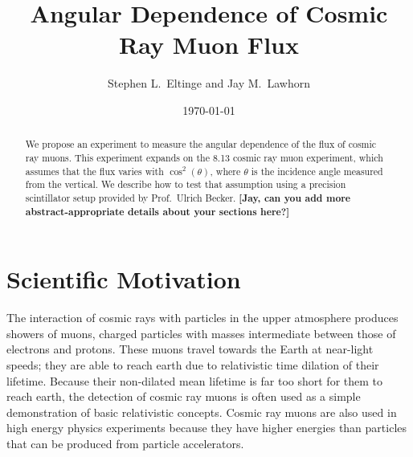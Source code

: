 \usepackage{lgrind} %
\usepackage{chapterbib} %
\usepackage{color} %
\usepackage{graphics}      %
\usepackage[pdftex]{graphicx} %
\usepackage{longtable}     %
\usepackage{epsf} %
\usepackage{bm}            %
\usepackage{thumbpdf}
\usepackage[colorlinks=true]{hyperref} %
\usepackage{multirow}
\usepackage{subfigure}

\newcommand{\cd}{$\cdot$}

%
%


\title{Angular Dependence of Cosmic Ray Muon Flux}
\author{Stephen L.\ Eltinge and Jay M.\ Lawhorn}
\date{\today}

\begin{abstract}
We propose an experiment to measure the angular dependence of the flux of cosmic ray muons. This experiment expands on the 8.13 cosmic ray muon experiment, which assumes that the flux varies with $\cos^2(\theta)$, where $\theta$ is the incidence angle measured from the vertical. We describe how to test that assumption using a precision scintillator setup provided by Prof.\ Ulrich Becker. \textbf{[Jay, can you add more abstract-appropriate details about your sections here?]}
\end{abstract}

\maketitle

\section{Scientific Motivation}

The interaction of cosmic rays with particles in the upper atmosphere produces showers of muons, charged particles with masses intermediate between those of electrons and protons. These muons travel towards the Earth at near-light speeds; they are able to reach earth due to relativistic time dilation of their lifetime. Because their non-dilated mean lifetime is far too short for them to reach earth, the detection of cosmic ray muons is often used as a simple demonstration of basic relativistic concepts. Cosmic ray muons are also used in high energy physics experiments because they have higher energies than particles that can be produced from particle accelerators.

